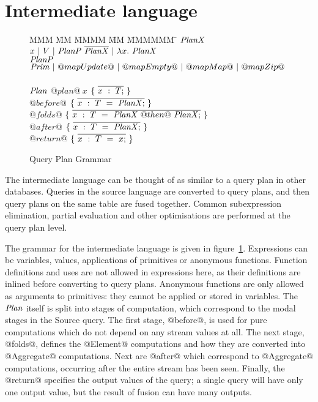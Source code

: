 \section{Intermediate language}
\label{s:IcicleCore}

\begin{figure}

\begin{tabbing}
MMM \= MM \= MMMM \= MM \= MMMMMM \= \kill
$\mathit{PlanX}$
\GrammarDef
  $x~|~V~|~\mathit{PlanP}~\overline{\mathit{PlanX}}~|~\lambda{}x.~\mathit{PlanX}$
\\
$\mathit{PlanP}$
\GrammarDef
  $\mathit{Prim}~|~@mapUpdate@~|~@mapEmpty@~|~@mapMap@~|~@mapZip@$
\\
\\
$\mathit{Plan}$
\GrammarDef
  $@plan@~x$ \> $\{~\overline{x~:~T;}~\}$
\\
  \> \> $@before@$ \> $\{~\overline{x~:~T~=~\mathit{PlanX};}~\}$ \\
  \> \> $@folds@$  \> $\{~\overline{x~:~T~=~\mathit{PlanX}~@then@~\mathit{PlanX};}~\}$ \\
  \> \> $@after@$  \> $\{~\overline{x~:~T~=~\mathit{PlanX};}~\}$ \\
  \> \> $@return@$ \> $\{~\overline{x~:~T~=~x;}~\}$ \\
\end{tabbing}



\caption{Query Plan Grammar}
\label{fig:core:grammar}
\end{figure}

The intermediate language can be thought of as similar to a query plan in other databases.
Queries in the source language are converted to query plans, and then query plans on the same table are fused together.
Common subexpression elimination, partial evaluation and other optimisations are performed at the query plan level.

The grammar for the intermediate language is given in figure~\ref{fig:core:grammar}.
Expressions can be variables, values, applications of primitives or anonymous functions.
Function definitions and uses are not allowed in expressions here, as their definitions are inlined before converting to query plans.
Anonymous functions are only allowed as arguments to primitives: they cannot be applied or stored in variables.
The $\mathit{Plan}$ itself is split into stages of computation, which correspond to the modal stages in the Source query.
The first stage, @before@, is used for pure computations which do not depend on any stream values at all.
The next stage, @folds@, defines the @Element@ computations and how they are converted into @Aggregate@ computations.
Next are @after@ which correspond to @Aggregate@ computations, occurring after the entire stream has been seen.
Finally, the @return@ specifies the output values of the query; a single query will have only one output value, but the result of fusion can have many outputs.


